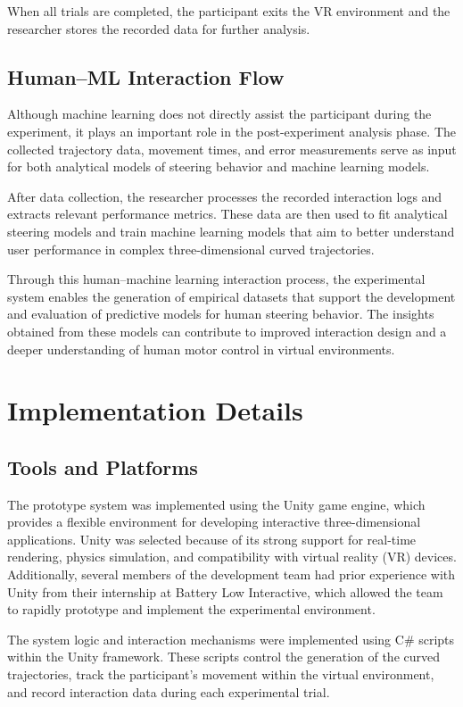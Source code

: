 \documentclass[sigconf]{acmart}
\begin{document}
When all trials are completed, the participant exits the VR environment and the researcher stores the recorded data for further analysis.

\subsection{Human–ML Interaction Flow}

Although machine learning does not directly assist the participant during the experiment, it plays an important role in the post-experiment analysis phase. The collected trajectory data, movement times, and error measurements serve as input for both analytical models of steering behavior and machine learning models.

After data collection, the researcher processes the recorded interaction logs and extracts relevant performance metrics. These data are then used to fit analytical steering models and train machine learning models that aim to better understand user performance in complex three-dimensional curved trajectories.

Through this human–machine learning interaction process, the experimental system enables the generation of empirical datasets that support the development and evaluation of predictive models for human steering behavior. The insights obtained from these models can contribute to improved interaction design and a deeper understanding of human motor control in virtual environments.

\section{Implementation Details}

\subsection{Tools and Platforms}

The prototype system was implemented using the Unity game engine, which provides a flexible environment for developing interactive three-dimensional applications. Unity was selected because of its strong support for real-time rendering, physics simulation, and compatibility with virtual reality (VR) devices. Additionally, several members of the development team had prior experience with Unity from their internship at Battery Low Interactive, which allowed the team to rapidly prototype and implement the experimental environment.

The system logic and interaction mechanisms were implemented using C\# scripts within the Unity framework. These scripts control the generation of the curved trajectories, track the participant's movement within the virtual environment, and record interaction data during each experimental trial.
\end{document}
